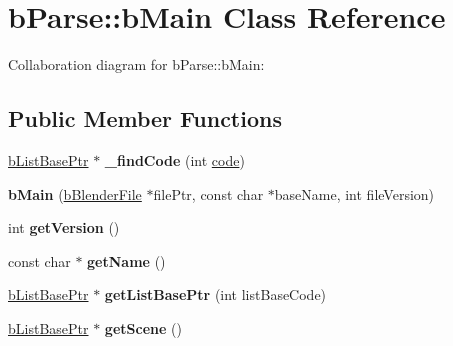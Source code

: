 \hypertarget{classb_parse_1_1b_main}{\section{b\+Parse\+:\+:b\+Main Class Reference}
\label{classb_parse_1_1b_main}
}


Collaboration diagram for b\+Parse\+:\+:b\+Main\+:
\subsection*{Public Member Functions}
\begin{DoxyCompactItemize}
\item 
\hypertarget{classb_parse_1_1b_main_ab8725586edfcc1c0c54dc6b92700de10}{\hyperlink{classbt_aligned_object_array}{b\+List\+Base\+Ptr} $\ast$ {\bfseries \+\_\+find\+Code} (int \hyperlink{structcode}{code})}\label{classb_parse_1_1b_main_ab8725586edfcc1c0c54dc6b92700de10}

\item 
\hypertarget{classb_parse_1_1b_main_a40108aec21b213d97edb6c0bb3329356}{{\bfseries b\+Main} (\hyperlink{classb_parse_1_1b_blender_file}{b\+Blender\+File} $\ast$file\+Ptr, const char $\ast$base\+Name, int file\+Version)}\label{classb_parse_1_1b_main_a40108aec21b213d97edb6c0bb3329356}

\item 
\hypertarget{classb_parse_1_1b_main_adcfd030a32ebc75410437477f7c8261e}{int {\bfseries get\+Version} ()}\label{classb_parse_1_1b_main_adcfd030a32ebc75410437477f7c8261e}

\item 
\hypertarget{classb_parse_1_1b_main_a237e28f06921ee68b4fecd8f56445a0e}{const char $\ast$ {\bfseries get\+Name} ()}\label{classb_parse_1_1b_main_a237e28f06921ee68b4fecd8f56445a0e}

\item 
\hypertarget{classb_parse_1_1b_main_acdaa601058de9a390ebec62f0d5dacf3}{\hyperlink{classbt_aligned_object_array}{b\+List\+Base\+Ptr} $\ast$ {\bfseries get\+List\+Base\+Ptr} (int list\+Base\+Code)}\label{classb_parse_1_1b_main_acdaa601058de9a390ebec62f0d5dacf3}

\item 
\hypertarget{classb_parse_1_1b_main_a9884d5aa86cbc4fc3b58abe9ebac4c33}{\hyperlink{classbt_aligned_object_array}{b\+List\+Base\+Ptr} $\ast$ {\bfseries get\+Scene} ()}\label{classb_parse_1_1b_main_a9884d5aa86cbc4fc3b58abe9ebac4c33}


\end{DoxyCompactItemize}

